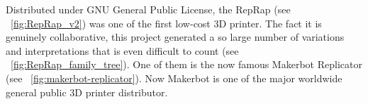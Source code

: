\begin{figure}[]
\centering
    \hfil
    \caption{}
    \label{fig:RepRap_project}
\end{figure}


Distributed under GNU General Public License, the RepRap (see \figurename~\ref{fig:RepRap_v2}) was one of the first low-cost 3D printer. The fact it is genuinely collaborative, this project generated a so large number of variations and interpretations that is even difficult to count (see \figurename~\ref{fig:RepRap_family_tree}). One of them is the now famous Makerbot Replicator (see \figurename~\ref{fig:makerbot-replicator}). Now Makerbot is one of the major worldwide general public 3D printer distributor.
